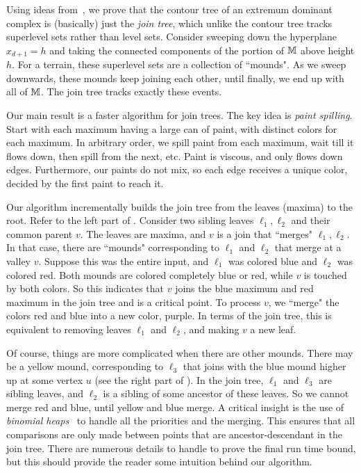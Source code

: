 {Using ideas from~\cite{csa-cctad-00}, we prove that the contour tree of an extremum dominant complex is (basically) just the \emph{join tree}, 
which unlike the contour tree tracks superlevel sets rather than level sets.
Consider sweeping down the hyperplane $x_{d+1} = h$ and taking the connected components of the portion of $\mathbb{M}$ above height $h$. For a terrain, these superlevel
sets are a collection of ``mounds". As we sweep downwards, these mounds keep joining each other,
until finally, we end up with all of $\mathbb{M}$. The join tree tracks exactly these events. 

 Our main result is a faster algorithm for join trees.
The key idea is \emph{paint spilling}. Start with each maximum having a large can of paint, with distinct
colors for each maximum. In arbitrary order, we spill paint from each maximum, wait till it flows down,
then spill from the next, etc. Paint is viscous, and only flows down edges. Furthermore, our paints do not mix, so each edge receives a unique color, decided by the first
paint to reach it.  

Our algorithm incrementally builds the join tree from the leaves (maxima) to the root. 
Refer to the left part of .
Consider two sibling leaves $\ell_1, \ell_2$ and their common parent $v$. The leaves are maxima,
and $v$ is a join that ``merges" $\ell_1, \ell_2$. 
In that case, there are ``mounds" corresponding to $\ell_1$ and $\ell_2$ that merge
at a valley $v$. Suppose this was the entire input, and $\ell_1$ was colored blue and $\ell_2$ was colored red. 
Both mounds are colored completely blue or red, while $v$ is touched by both colors.
So this indicates that $v$ joins the blue maximum and red maximum in the join tree and is a critical point.
To process $v$, we ``merge" the colors red and blue into a new color, purple. 
In terms of the join tree, this
is equivalent to removing leaves $\ell_1$ and $\ell_2$, and making $v$ a new leaf.

Of course, things are more complicated when there are other mounds. There may be a yellow mound,
corresponding to $\ell_3$ that joins with the blue mound higher up at some vertex $u$ (see the right part of ). In the join tree, $\ell_1$ and $\ell_3$
are sibling leaves, and $\ell_2$ is a sibling of some ancestor of these leaves. So we cannot
merge red and blue, until yellow and blue merge. 
A critical insight is the use of \emph{binomial heaps}~\cite{Vu78} to handle all the priorities and the merging.
This ensures that all comparisons are only made between points that are ancestor-descendant in the join tree.
There are numerous details to handle to prove the final run time bound, but this should provide the reader
some intuition behind our algorithm.

}
